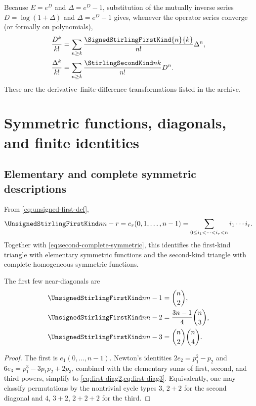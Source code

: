 \documentclass[11pt,a4paper,oneside,openany]{book}
\theoremstyle{definition}
\theoremstyle{remark}
\begin{document}
Because $E=e^D$ and $\Delta=e^D-1$, substitution of the mutually inverse series
$D=\log(1+\Delta)$ and $\Delta=e^D-1$ gives, whenever the operator series converge
(or formally on polynomials),
\begin{align}
 \frac{D^k}{k!}
   &=\sum_{n\ge k}\frac{\SignedStirlingFirstKind{n}{k}}{n!}\Delta^n,
   \label{eq:der-from-diff}\\
 \frac{\Delta^k}{k!}
   &=\sum_{n\ge k}\frac{\StirlingSecondKind nk}{n!}D^n.
   \label{eq:diff-from-der}
\end{align}
These are the derivative--finite-difference transformations listed in the archive.

\chapter{Symmetric functions, diagonals, and finite identities}
\label{ch:stirling-identities}

\section{Elementary and complete symmetric descriptions}
From \cref{eq:unsigned-first-def},
\begin{equation}\label{eq:first-elementary}
 \UnsignedStirlingFirstKind n{n-r}=e_r(0,1,\ldots,n-1)
 =\sum_{0\le i_1<\cdots<i_r<n}i_1\cdots i_r.
\end{equation}
Together with \cref{eq:second-complete-symmetric}, this identifies the first-kind
triangle with elementary symmetric functions and the second-kind triangle with
complete homogeneous symmetric functions.

The first few near-diagonals are
\begin{align}
 \UnsignedStirlingFirstKind n{n-1}&=\binom n2,\label{eq:first-diag1}\\
 \UnsignedStirlingFirstKind n{n-2}&=\frac{3n-1}{4}\binom n3,\label{eq:first-diag2}\\
 \UnsignedStirlingFirstKind n{n-3}&=\binom n2\binom n4.\label{eq:first-diag3}
\end{align}
\begin{proof}
The first is $e_1(0,\ldots,n-1)$.  Newton's identities
$2e_2=p_1^2-p_2$ and $6e_3=p_1^3-3p_1p_2+2p_3$, combined with the elementary sums
of first, second, and third powers, simplify to \cref{eq:first-diag2,eq:first-diag3}.
Equivalently, one may classify permutations by the nontrivial cycle types
$3$, $2+2$ for the second diagonal and $4$, $3+2$, $2+2+2$ for the third.
\end{proof}
\end{document}

